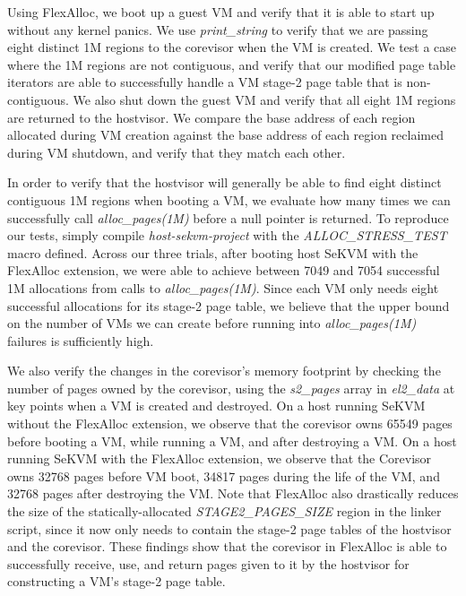 Using FlexAlloc, we boot up a guest VM and verify that it is able to start up
without any kernel panics. We use \textit{print\_string} to verify that we
are passing eight distinct 1M regions to the corevisor when the VM is created.
We test a case where the 1M regions are not contiguous, and verify that our
modified page table iterators are able to successfully handle a VM stage-2 page
table that is non-contiguous. We also shut down the guest VM and verify that
all eight 1M regions are returned to the hostvisor. We compare the base address
of each region allocated during VM creation against the base address of each
region reclaimed during VM shutdown, and verify that they match each other.

In order to verify that the hostvisor will generally be able to find eight distinct contiguous 1M regions when booting a VM, we evaluate how many times we can successfully call
\textit{alloc\_pages(1M)} before a null pointer is returned. To reproduce our tests,
simply compile \textit{host-sekvm-project} with the \textit{ALLOC\_STRESS\_TEST} macro defined.
Across our three trials, after booting host SeKVM with the FlexAlloc extension,
we were able to achieve between 7049 and 7054 successful 1M allocations
from calls to \textit{alloc\_pages(1M)}. Since each VM only needs eight successful allocations for its stage-2 page table,
we believe that the upper bound on the number of VMs we can create before running into \textit{alloc\_pages(1M)}
failures is sufficiently high.

We also verify the changes in the corevisor's memory footprint by checking the number of
pages owned by the corevisor, using the \textit{s2\_pages} array in \textit{el2\_data} at key points
when a VM is created and destroyed. On a host running SeKVM without the
FlexAlloc extension, we observe that the corevisor owns 65549 pages before booting a VM,
while running a VM, and after destroying a VM. On a host running SeKVM with the FlexAlloc
extension, we observe that the Corevisor owns 32768 pages before VM boot, 34817 pages
during the life of the VM, and 32768 pages after destroying the VM.
Note that FlexAlloc also drastically reduces the size of the statically-allocated \textit{STAGE2\_PAGES\_SIZE} region in the linker script,
since it now only needs to contain the stage-2 page tables of the hostvisor and the corevisor.
These findings show that the corevisor in FlexAlloc is able to successfully receive, use, and return pages
given to it by the hostvisor for constructing a VM's stage-2 page table.

